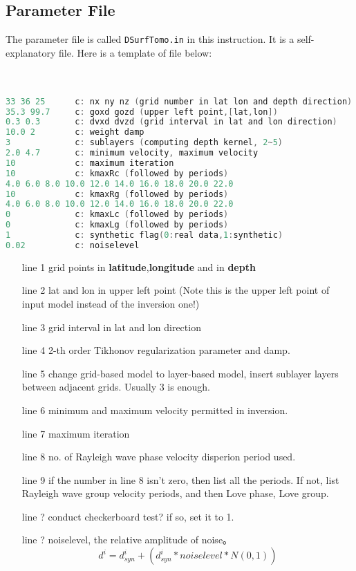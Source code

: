 \documentclass[UTF8]{article}
\begin{document}
    \subsection{Parameter File}
    The parameter file is called \verb!DSurfTomo.in! in this instruction. It is a self-explanatory file.
    Here is a template of file below: \\
    \\
    \\
\begin{lstlisting}[language=c]
33 36 25      c: nx ny nz (grid number in lat lon and depth direction)
35.3 99.7     c: goxd gozd (upper left point,[lat,lon])
0.3 0.3       c: dvxd dvzd (grid interval in lat and lon direction)
10.0 2        c: weight damp
3             c: sublayers (computing depth kernel, 2~5)
2.0 4.7       c: minimum velocity, maximum velocity
10            c: maximum iteration
10            c: kmaxRc (followed by periods)
4.0 6.0 8.0 10.0 12.0 14.0 16.0 18.0 20.0 22.0 
10            c: kmaxRg (followed by periods)
4.0 6.0 8.0 10.0 12.0 14.0 16.0 18.0 20.0 22.0 
0             c: kmaxLc (followed by periods)
0             c: kmaxLg (followed by periods)
1             c: synthetic flag(0:real data,1:synthetic)
0.02          c: noiselevel
\end{lstlisting}
    \begin{enumerate}
        \item [line 1] grid points in \textbf{latitude},\textbf{longitude}
                    and in \textbf{depth}
        \item[line 2] lat and lon in upper left point (Note this is the upper left point of input 
                    model instead of the inversion one!)
        \item[line 3] grid interval in lat and lon direction 
        \item[line 4] 2-th order Tikhonov regularization parameter and damp.
        \item[line 5] change grid-based model to layer-based model, insert sublayer layers between 
                      adjacent grids. Usually 3 is enough. 
        \item[line 6] minimum and maximum velocity permitted in inversion.
        \item[line 7] maximum iteration
        \item[line 8] no. of Rayleigh wave phase velocity disperion period used.
        \item[line 9] if the number in line 8 isn't zero, then list all the periods. If not,
                      list Rayleigh wave group velocity periods, and then Love phase, Love group.
        \item[line ?] conduct checkerboard test? if so, set it to 1.
        \item[line ?]  noiselevel, the relative amplitude of noise。
        \[   
            d^i = d_{syn}^i + (d_{syn}^i * noiselevel * N(0,1))
         \]
    \end{enumerate}
\end{document}
